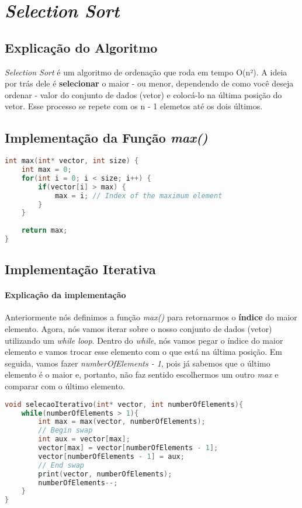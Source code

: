 \section{\textit{Selection Sort}}

\subsection{Explicação do Algoritmo}
\textit{Selection Sort} é um algoritmo de ordenação que roda em tempo O(n²). A ideia por trás dele é \textbf{selecionar} o maior - ou menor, dependendo de como você deseja ordenar - 
valor do conjunto de dados (vetor) e colocá-lo na última posição do vetor. Esse processo se repete com os n - 1 elemetos até os dois últimos.

\subsection{Implementação da Função \textit{max()}}
\begin{lstlisting}[language=C]
int max(int* vector, int size) {
    int max = 0;
    for(int i = 0; i < size; i++) {
        if(vector[i] > max) {
            max = i; // Index of the maximum element
        }
    }
    
    return max;
}
\end{lstlisting}

\subsection{Implementação Iterativa}
\paragraph{Explicação da implementação}
Anteriormente nós definimos a função \textit{max()} para retornarmos o \textbf{índice} do maior elemento. Agora, nós vamos iterar sobre o nosso conjunto de dados (vetor) utilizando
um \textit{while loop}. Dentro do \textit{while}, nós vamos pegar o índice do maior elemento e vamos trocar esse elemento com o que está na última posição. Em seguida, vamos fazer
\textit{numberOfElements - 1}, pois já sabemos que o último elemento é o maior e, portanto, não faz sentido escolhermos um outro \textit{max} e comparar com o último elemento.
\begin{lstlisting}[language=C]
void selecaoIterativo(int* vector, int numberOfElements){
    while(numberOfElements > 1){
        int max = max(vector, numberOfElements);
        // Begin swap
        int aux = vector[max];
        vector[max] = vector[numberOfElements - 1];
        vector[numberOfElements - 1] = aux;
        // End swap
        print(vector, numberOfElements);
        numberOfElements--;
    }
}
\end{lstlisting}


